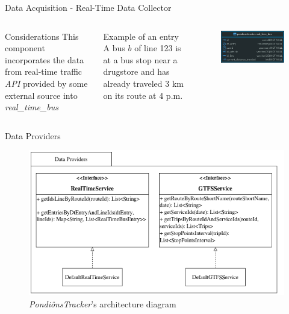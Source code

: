 \documentclass[xcolor=dvipsnames,table]{beamer}
\begin{document}
\begin{frame}{Data Acquisition - Real-Time Data Collector}
        \begin{columns}
                \begin{block}{Considerations}
                        This component incorporates the data 
                        from real-time traffic \textit{API} provided by some external source into {\em  real\_time\_bus}
                \end{block}
                \begin{block}{Example of an entry}
                        A bus $b$ of line 123 is at a bus stop
                        near a drugstore and has already traveled 3 km on its route at 4 p.m.
                \end{block}
                \centering
                \begin{figure}[H]
                        \centering
                        \includegraphics[scale=0.25]{images/real_time_bus_ER.png}
                \end{figure}
        \end{columns}
\end{frame}
\begin{frame}{Data Providers}
        \begin{figure}[H]
                \centering
                \includegraphics[scale=0.45]{images/dataProviderED.drawio.png}
                \caption{\textit{PondiônsTracker}'s architecture diagram}
        \end{figure}
\end{frame}
\end{document}
